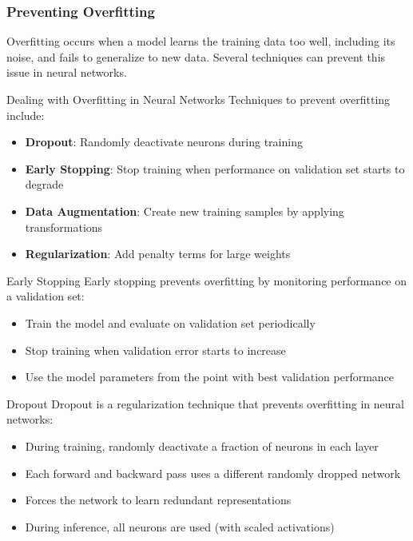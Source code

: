 \subsubsection{Preventing Overfitting}

Overfitting occurs when a model learns the training data too well, including its noise, and fails to generalize to new data. Several techniques can prevent this issue in neural networks.

\begin{concept}{Dealing with Overfitting in Neural Networks}
Techniques to prevent overfitting include:
\begin{itemize}
    \item \textbf{Dropout}: Randomly deactivate neurons during training
    \item \textbf{Early Stopping}: Stop training when performance on validation set starts to degrade
    \item \textbf{Data Augmentation}: Create new training samples by applying transformations
    \item \textbf{Regularization}: Add penalty terms for large weights
\end{itemize}
\end{concept}

\begin{definition}{Early Stopping}
Early stopping prevents overfitting by monitoring performance on a validation set:
\begin{itemize}
    \item Train the model and evaluate on validation set periodically
    \item Stop training when validation error starts to increase
    \item Use the model parameters from the point with best validation performance
\end{itemize}
\end{definition}

\begin{definition}{Dropout}
Dropout is a regularization technique that prevents overfitting in neural networks:
\begin{itemize}
    \item During training, randomly deactivate a fraction of neurons in each layer
    \item Each forward and backward pass uses a different randomly dropped network
    \item Forces the network to learn redundant representations
    \item During inference, all neurons are used (with scaled activations)
\end{itemize}
\end{definition}



